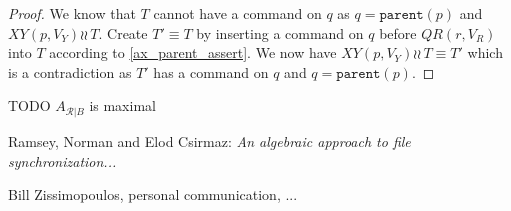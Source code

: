 \documentclass[12pt]{article}
\newcommand{\parent}{\mathtt{parent}}
\newcommand{\fscommand}[2]{{#1#2}}
\newcommand{\cxy}{\fscommand{X}{Y}}
\newcommand{\cqr}{\fscommand{Q}{R}}
\newcommand{\indep}{\wr\!\!\wr\,} %
\newcommand{\recchar}[3]{{#1}^{#3}_{\mathcal{R}|{#2}}}
\newcommand{\reca}{\recchar{A}{B}{}} %
\theoremstyle{definition}
\begin{document}
\begin{proof}
We know that $T$ cannot have a command on $q$ as $q=\parent(p)$ and $\cxy(p,V_Y)\indep T$.
Create $T'\equiv T$ by inserting a command on $q$ before $\cqr(r,V_R)$
into $T$ according to \cref{ax_parent_assert}.
We now have $\cxy(p,V_Y)\indep T\equiv T'$ which is a contradiction as
$T'$ has a command on $q$ and $q=\parent(p)$.

\end{proof}

TODO $\reca$ is maximal

\begin{thebibliography}{99}

 Ramsey, Norman and Elod Csirmaz: {\it An algebraic approach to
file synchronization...}

 Bill Zissimopoulos, personal communication, ...

\end{thebibliography}
\end{document}
